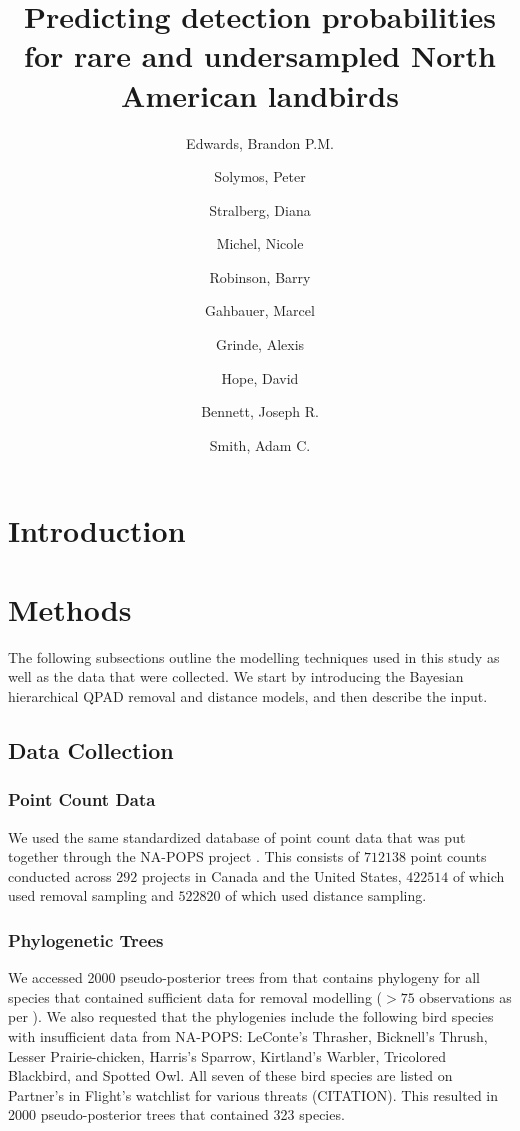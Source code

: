 \documentclass[12pt]{article}
\title{Predicting detection probabilities for rare and undersampled North American landbirds}
\author{
	Edwards, Brandon P.M.\\
	\and
	Solymos, Peter\\
	\and
	Stralberg, Diana\\
	\and
	Michel, Nicole\\
	\and
	Robinson, Barry\\
	\and
	Gahbauer, Marcel\\
	\and
	Grinde, Alexis\\
	\and
	Hope, David\\
	\and
	Bennett, Joseph R.\\
	\and
	Smith, Adam C.\\
}
\begin{document}
\maketitle

\begin{abstract}

\end{abstract}

\section{Introduction}

\section{Methods}

\par The following subsections outline the modelling techniques used in this study as well as the data that were collected. 
We start by introducing the Bayesian hierarchical QPAD removal and distance models, and then describe the input.

\subsection{Data Collection}
\subsubsection{Point Count Data}
\par We used the same standardized database of point count data that was put together through the NA-POPS project \cite{edwards_point_2023}. 
This consists of $712138$ point counts conducted across $292$ projects in Canada and the United States, $422514$ of which used removal sampling and $522820$ of which used distance sampling.

\subsubsection{Phylogenetic Trees}
\par We accessed 2000 pseudo-posterior trees from \citet{jetz_global_2012} that contains phylogeny for all species that contained sufficient data for removal modelling ($>75$ observations as per \cite{edwards_point_2023,solymos_evaluating_2018,buckland_introduction_2001}). 
We also requested that the phylogenies include the following bird species with insufficient data from NA-POPS: LeConte's Thrasher, Bicknell's Thrush, Lesser Prairie-chicken, Harris's Sparrow, Kirtland's Warbler, Tricolored Blackbird, and Spotted Owl. 
All seven of these bird species are listed on Partner's in Flight's watchlist for various threats (CITATION). 
This resulted in 2000 pseudo-posterior trees that contained 323 species.
\end{document}
